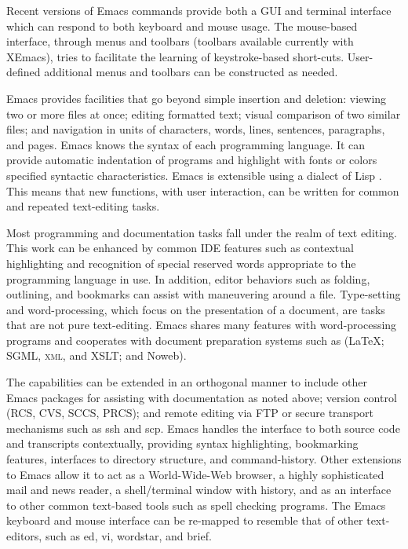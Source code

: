 \documentclass{article}
\begin{document}
Recent versions of Emacs commands provide both a GUI and terminal
interface which can respond to both keyboard and mouse usage.  The
mouse-based interface, through menus and toolbars (toolbars available
currently with XEmacs), tries to facilitate the learning of
keystroke-based short-cuts.  User-defined additional menus and
toolbars can be constructed as needed.

Emacs provides facilities that go beyond simple insertion and
deletion: viewing two or more files at once; editing formatted text;
visual comparison of two similar files; and navigation in units of
characters, words, lines, sentences, paragraphs, and pages.  Emacs
knows the syntax of each programming language.  It can provide
automatic indentation of programs and highlight with fonts or colors
specified syntactic characteristics.  Emacs is extensible using a
dialect of Lisp \citep{RChassell1999,PGraham:1996}.  This means that
new functions, with user interaction, can be written for common and
repeated text-editing tasks.

Most programming and documentation tasks fall under the realm of text
editing.  This work can be enhanced by common IDE features such as
contextual highlighting and recognition of special reserved words
appropriate to the programming language in use.  In addition, editor
behaviors such as folding, outlining, and bookmarks can assist with
maneuvering around a file.  Type-setting and word-processing, which
focus on the presentation of a document, are tasks that are not pure
text-editing.  Emacs shares many features with word-processing
programs and cooperates with document preparation systems such as
(\LaTeX; SGML, \textsc{xml}, and XSLT; and Noweb).

The capabilities can be extended in an orthogonal manner to include
other Emacs packages for assisting with documentation as noted above;
version control (RCS, CVS, SCCS, PRCS); and remote editing via FTP or
secure transport mechanisms such as ssh and scp.  Emacs handles the
interface to both source code and transcripts contextually, providing
syntax highlighting, bookmarking features, interfaces to directory
structure, and command-history.  Other extensions to Emacs allow it to
act as a World-Wide-Web browser, a highly sophisticated mail and news
reader, a shell/terminal window with history, and as an interface to
other common text-based tools such as spell checking programs.  The
Emacs keyboard and mouse interface can be re-mapped to resemble that
of other text-editors, such as ed, vi, wordstar, and brief.
\end{document}
